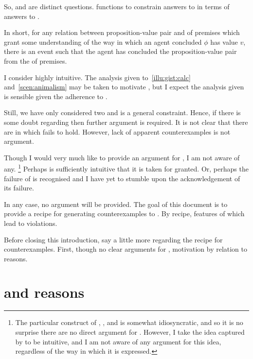 \begin{note}
  So, \qWhy{} and \qHow{} are distinct questions.
  \issueInclusion{} functions to constrain answers to \qWhy{} in terms of answers to \qHow{}.

  In short, for any relation between proposition-value pair and \poP{} of premises which grant some understanding of the way in which an agent concluded \(\phi\) has value \(v\), there is an event such that the agent has concluded the proposition-value pair from the \poP{} of premises.

  I consider \issueInclusion{} highly intuitive.
  The analysis given to~\autoref{illu:gist:calc} and~\autoref{scen:animalism} may be taken to motivate \issueInclusion{}, but I expect the analysis given is sensible given the adherence to \issueInclusion{}.

  Still, we have only considered two  and \issueInclusion{} is a general constraint.
  Hence, if there is some doubt regarding \issueInclusion{} then further argument is required.
  It is not clear that there are  in which \issueInclusion{} fails to hold.
  However, lack of apparent counterexamples is not argument.

  Though I would very much like to provide an argument for \issueInclusion{}, I am not aware of any.%
  \footnote{
    The particular construct of \qWhy{}, \qHow{}, and \issueInclusion{} is somewhat idiosyncratic, and so it is no surprise there are no direct argument for \issueInclusion{}.
    However, I take the idea captured by \issueInclusion{} to be intuitive, and I am not aware of any argument for this idea, regardless of the way in which it is expressed.
  }
  Perhaps \issueInclusion{} is sufficiently intuitive that it is taken for granted.
  Or, perhaps the failure of \issueInclusion{} is recognised and I have yet to stumble upon the acknowledgement of its failure.

  In any case, no argument will be provided.
  The goal of this document is to provide a recipe for generating counterexamples to \issueConstraint{}.
  By recipe, features of  which lead to violations.

  Before closing this introduction, say a little more regarding the recipe for counterexamples.
  First, though no clear arguments for \issueInclusion{}, motivation by relation to reasons.
\end{note}

\section*{\issueInclusion{} and reasons}
\label{sec:reasons}

